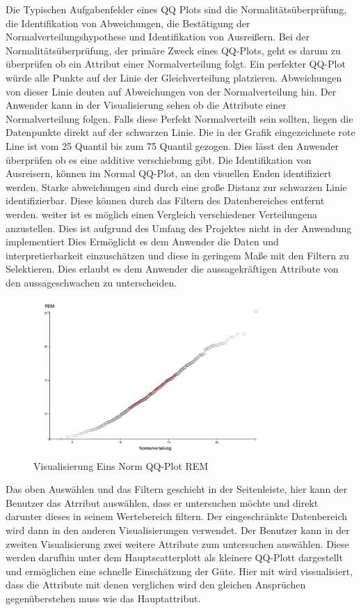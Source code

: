\documentclass[usegeometry=true]{scrartcl}
\begin{document}
Die Typischen Aufgabenfelder eines QQ Plots sind die Normalitätsüberprüfung, die Identifikation von Abweichungen, die Bestätigung der Normalverteilungshypothese und Identifikation von Ausreißern.
Bei der Normalitätsüberprüfung, der primäre Zweck eines QQ-Plots, geht es darum zu überprüfen ob ein Attribut 
einer Normalverteilung folgt. Ein perfekter QQ-Plot würde alle Punkte auf der Linie der Gleichverteilung platzieren.
 Abweichungen von dieser Linie deuten auf Abweichungen von der Normalverteilung hin. Der Anwender kann in der Visualisierung
 sehen ob die Attribute einer Normalverteilung folgen. Falls diese Perfekt Normalverteilt sein sollten, liegen die Datenpunkte 
 direkt auf der schwarzen Linie. Die in der Grafik eingezeichnete rote Line ist vom 25 Quantil bis zum 75 Quantil gezogen. Dies lässt den Anwender überprüfen ob es eine additive verschiebung gibt. 
Die Identifikation von Ausreisern, können im Normal QQ-Plot, an den visuellen Enden identifiziert werden. Starke abweichungen sind durch eine große Distanz zur schwarzen Linie identifizierbar. Diese können durch das Filtern des Datenbereiches entfernt werden. 
weiter ist es möglich einen Vergleich verschiedener Verteilungena anzustellen. Dies ist aufgrund des Umfang des Projektes nicht in der Anwendung implementiert
Dies Ermöglicht es dem Anwender die Daten und interpretierbarkeit einzuschätzen und diese in geringem Maße mit den Filtern zu Selektieren. Dies erlaubt es dem Anwender die aussagekräftigen Attribute von den aussageschwachen zu unterscheiden.


\begin{figure}[h]
  \centering
  \includegraphics [width = 0.8\textwidth]{NormQQPlott.JPG}
  \caption{Visualisierung Eins  Norm QQ-Plot REM }
\end{figure}

Das oben Auswählen und das Filtern geschieht in der Seitenleiste, hier kann der Benutzer das Atrribut auswählen, dass er untersuchen möchte und direkt darunter dieses in seinem Wertebereich filtern. 
Der eingeschränkte Datenbereich wird dann in den anderen Visualisierungen verwendet.
Der Benutzer kann in der zweiten Visualisierung zwei weitere Attribute zum untersuchen auswählen. Diese werden darufhin unter dem Hauptscatterplott als kleinere QQ-Plott dargestellt und ermöglichen eine schnelle Einschätzung der Güte. 
Hier mit wird vissualisiert, dass die Attribute mit denen verglichen wird den gleichen Ansprüchen gegenüberstehen muss wie das Hauptattribut.
\end{document}
